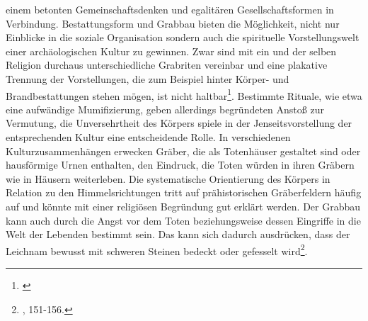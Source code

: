 \documentclass[openany,twoside,twocolumn]{book}
\let\rmarkdownfootnote\footnote%
\def\footnote{\protect\rmarkdownfootnote}
\begin{document}
einem betonten Gemeinschaftsdenken und egalitären Gesellschaftsformen in
Verbindung. Bestattungsform und Grabbau bieten die Möglichkeit, nicht
nur Einblicke in die soziale Organisation sondern auch die spirituelle
Vorstellungswelt einer archäologischen Kultur zu gewinnen. Zwar sind mit
ein und der selben Religion durchaus unterschiedliche Grabriten
vereinbar und eine plakative Trennung der Vorstellungen, die zum
Beispiel hinter Körper- und Brandbestattungen stehen mögen, ist nicht
haltbar\footnote{\textcite{portmann_sterben_1993}}. Bestimmte Rituale,
wie etwa eine aufwändige Mumifizierung, geben allerdings begründeten
Anstoß zur Vermutung, die Unversehrtheit des Körpers spiele in der
Jenseitsvorstellung der entsprechenden Kultur eine entscheidende Rolle.
In verschiedenen Kulturzusammenhängen erwecken Gräber, die als
Totenhäuser gestaltet sind oder hausförmige Urnen enthalten, den
Eindruck, die Toten würden in ihren Gräbern wie in Häusern weiterleben.
Die systematische Orientierung des Körpers in Relation zu den
Himmelsrichtungen tritt auf prähistorischen Gräberfeldern häufig auf und
könnte mit einer religiösen Begründung gut erklärt werden. Der Grabbau
kann auch durch die Angst vor dem Toten beziehungsweise dessen Eingriffe
in die Welt der Lebenden bestimmt sein. Das kann sich dadurch
ausdrücken, dass der Leichnam bewusst mit schweren Steinen bedeckt oder
gefesselt wird\footnote{\textcite{hofmann_rituelle_2008}, 151-156.}.
\end{document}
